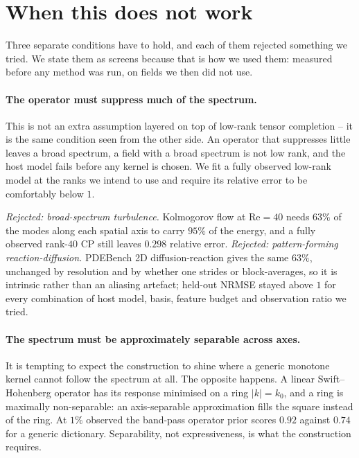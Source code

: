 \section{When this does not work}
\label{sec:limitations}

Three separate conditions have to hold, and each of them rejected something we
tried.  We state them as screens because that is how we used them: measured
before any method was run, on fields we then did not use.

\paragraph{The operator must suppress much of the spectrum.}
This is not an extra assumption layered on top of low-rank tensor completion --
it is the same condition seen from the other side.  An operator that suppresses
little leaves a broad spectrum, a field with a broad spectrum is not low rank,
and the host model fails before any kernel is chosen.  We fit a fully observed
low-rank model at the ranks we intend to use and require its relative error to be
comfortably below $1$.

\emph{Rejected: broad-spectrum turbulence.}  Kolmogorov flow at
$\mathrm{Re} = 40$ needs $63\%$ of the modes along each spatial axis to carry
$95\%$ of the energy, and a fully observed rank-$40$ CP still leaves $0.298$
relative error.  \emph{Rejected: pattern-forming reaction-diffusion.}  PDEBench
2D diffusion-reaction gives the same $63\%$, unchanged by resolution and by
whether one strides or block-averages, so it is intrinsic rather than an
aliasing artefact; held-out NRMSE stayed above $1$ for every combination of host
model, basis, feature budget and observation ratio we tried.

\paragraph{The spectrum must be approximately separable across axes.}
It is tempting to expect the construction to shine where a generic monotone
kernel cannot follow the spectrum at all.  The opposite happens.  A linear
Swift--Hohenberg operator has its response minimised on a ring $\lvert k \rvert
= k_0$, and a ring is maximally non-separable: an axis-separable approximation
fills the square instead of the ring.  At $1\%$ observed the band-pass operator
prior scores $0.92$ against $0.74$ for a generic dictionary.  Separability, not
expressiveness, is what the construction requires.

